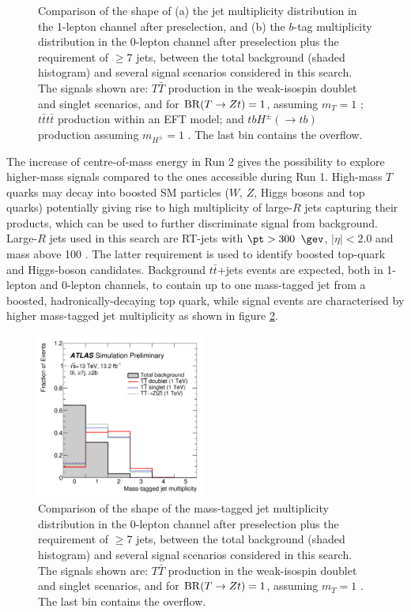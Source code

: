 \begin{figure}[h!]
\captionsetup{width=0.85\textwidth} \caption{\small Comparison of the shape of (a) the jet multiplicity distribution in the 1-lepton channel after preselection, and (b) the $b$-tag multiplicity distribution in the 0-lepton channel after preselection plus the requirement of $\ge$7 jets, between the total background (shaded histogram) and several signal scenarios considered in this search. The signals shown are: $T\bar{T}$ production in the weak-isospin doublet and singlet scenarios, and for ${\rm BR}(T\to Zt) = 1$, assuming $m_{T} = 1$ \tev; $t\bar{t}t\bar{t}$ production within an EFT model; and $tbH^{\pm}(\to tb)$ production assuming $m_{H^{\pm}} = 1$ \tev. The last bin contains the overflow.}
\label{fig:vlq:str:jetmult}
\end{figure}
The increase of centre-of-mass energy in Run 2 gives the possibility to explore higher-mass signals compared to the ones accessible during Run 1. High-mass $T$ quarks may decay into boosted SM particles ($W$, $Z$, Higgs bosons and top quarks) potentially giving rise to high multiplicity of large-$R$ jets capturing their products, which can be used to further discriminate signal from background. Large-$R$ jets used in this search are RT-jets with $\pt> 300$ $\gev$, $|\eta|<2.0$ and mass above 100 \gev. The latter requirement is used to identify boosted top-quark and Higgs-boson candidates. Background $t\bar{t}$+jets events are expected, both in 1-lepton and 0-lepton channels, to contain up to one mass-tagged jet from a boosted, hadronically-decaying top quark, while signal events are characterised by higher mass-tagged jet multiplicity as shown in figure \ref{fig:vlq:str:hotmult}.\par 
\begin{figure}[h!]
\centering
\includegraphics[width=0.5\textwidth]{figures/VLQ/nHOT.png}

\captionsetup{width=0.85\textwidth} \caption{\small Comparison of the shape of the mass-tagged jet multiplicity distribution in the 0-lepton channel after preselection plus the requirement of $\ge$7 jets, between the total background (shaded histogram) and several signal scenarios considered in this search. The signals shown are: $T\bar{T}$ production in the weak-isospin doublet and singlet scenarios, and for ${\rm BR}(T\to Zt) = 1$, assuming $m_{T} = 1$ \tev. The last bin contains the overflow.}
\label{fig:vlq:str:hotmult}
\end{figure}
